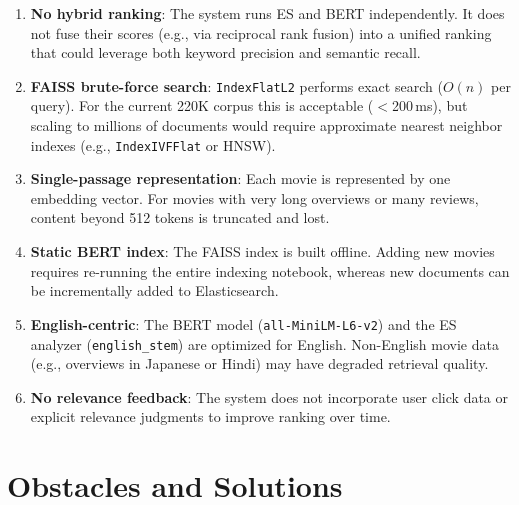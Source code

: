 \documentclass[11pt,a4paper]{article}
\begin{document}
\begin{enumerate}[nosep]
  \item \textbf{No hybrid ranking}: The system runs ES and BERT independently. It does not fuse their scores (e.g., via reciprocal rank fusion) into a unified ranking that could leverage both keyword precision and semantic recall.

  \item \textbf{FAISS brute-force search}: \texttt{IndexFlatL2} performs exact search ($O(n)$ per query). For the current 220K corpus this is acceptable ($<$200\,ms), but scaling to millions of documents would require approximate nearest neighbor indexes (e.g., \texttt{IndexIVFFlat} or HNSW).

  \item \textbf{Single-passage representation}: Each movie is represented by one embedding vector. For movies with very long overviews or many reviews, content beyond 512 tokens is truncated and lost.

  \item \textbf{Static BERT index}: The FAISS index is built offline. Adding new movies requires re-running the entire indexing notebook, whereas new documents can be incrementally added to Elasticsearch.

  \item \textbf{English-centric}: The BERT model (\texttt{all-MiniLM-L6-v2}) and the ES analyzer (\texttt{english\_stem}) are optimized for English. Non-English movie data (e.g., overviews in Japanese or Hindi) may have degraded retrieval quality.

  \item \textbf{No relevance feedback}: The system does not incorporate user click data or explicit relevance judgments to improve ranking over time.
\end{enumerate}

\section{Obstacles and Solutions}
\end{document}
